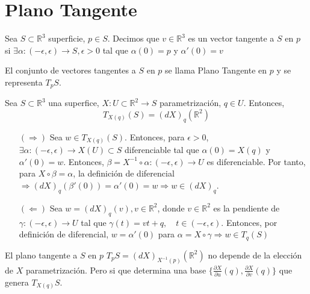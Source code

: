 \section{Plano Tangente}

\begin{defn}
  Sea $S \subset \mathbb{R}^{3}$ superficie, $p \in S$. Decimos que $v \in \mathbb{R}^{3}$ es un vector tangente a $S$ en $p$ si $\exists \alpha : (-\epsilon, \epsilon) \to S, \epsilon > 0$ tal que $\alpha(0) = p$ y $\alpha'(0) = v$
\end{defn}

\begin{nota}
  El conjunto de vectores tangentes a $S$ en $p$ se llama Plano Tangente en $p$ y se representa $T_{p}S$.
\end{nota}

\begin{prop}
  Sea $S \subset \mathbb{R}^{3}$ una superfice, $X : U \subset \mathbb{R}^{2} \to S$ parametrización, $q \in U$. Entonces,
  \[ 
    T_{X(q)}(S) = (d X)_{q}(\mathbb{R}^{2}) 
  \] 
\end{prop}

\begin{dem}
  \begin{enumerate}[label=(\roman*)]
    \item []
    \item [$(\Rightarrow)$] Sea $w \in T_{X(q)}(S)$. Entonces, para $\epsilon >0$, $\exists \alpha : (-\epsilon,\epsilon) \to X(U) \subset S$ diferenciable tal que $\alpha(0) = X(q)$ y $\alpha'(0) = w$. Entonces, $\beta = X^{-1} \circ \alpha : (-\epsilon, \epsilon) \to U$ es diferenciable. Por tanto, para $X \circ \beta = \alpha$, la definición de diferencial $\Rightarrow (d X)_{q}(\beta'(0)) = \alpha'(0) = w \Rightarrow w \in (d X)_{q}$.
    \item [$(\Leftarrow)$] Sea $w = (d X)_{q}(v), v \in \mathbb{R}^{2}$, donde $v \in \mathbb{R}^{2}$ es la pendiente de $\gamma : (-\epsilon, \epsilon) \to U$ tal que $\gamma(t) = v t + q, \quad t \in (-\epsilon, \epsilon)$. Entonces, por definición de diferencial, $w = \alpha'(0)$ para $\alpha = X \circ \gamma \Rightarrow w \in T_{q}(S)$
  \end{enumerate}
\end{dem}

\begin{obs}
  El plano tangente a $S$ en $p$ $T_{p}S = (dX)_{X^{-1}(p)}(\mathbb{R}^{2})$ no depende de la elección de $X$ parametrización. Pero si que determina una base $\{ \frac{\partial{X}}{\partial{u}}(q), \frac{\partial{X}}{\partial{v}}(q) \}$ que genera $T_{X(q)}S$.
\end{obs}

